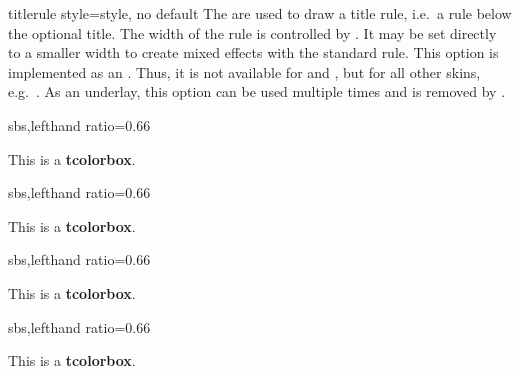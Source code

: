 \clearpage


\begin{docTcbKey}[][doc new=2015-01-14]{titlerule style}{=}{style, no default}
  The  are used to draw a title rule,
  i.e.\ a rule below the optional title. The width of the rule is controlled
  by . It may be set directly to a smaller width
  to create mixed effects with the standard rule.
  This option is implemented as an . Thus, it is not
  available for  and , but for
  all other skins, e.g.\ .
  As an underlay, this option can be used multiple times and is removed
  by .
\begin{dispExample*}{sbs,lefthand ratio=0.66}
\begin{tcolorbox}[enhanced,
  colback=red!5!white,colframe=red!75!black,
  colbacktitle=red!50!yellow,fonttitle=\bfseries,
  title=My title,
  titlerule=1mm,
  titlerule style=yellow  ]
This is a \textbf{tcolorbox}.
\end{tcolorbox}
\end{dispExample*}

\begin{dispExample*}{sbs,lefthand ratio=0.66}
\begin{tcolorbox}[enhanced,
  colback=red!5!white,colframe=red!75!black,
  colbacktitle=red!50!yellow,fonttitle=\bfseries,
  title=My title,
  titlerule=1mm,
  titlerule style={yellow,line width=0.5mm}  ]
This is a \textbf{tcolorbox}.
\end{tcolorbox}
\end{dispExample*}

\begin{dispExample*}{sbs,lefthand ratio=0.66}
\begin{tcolorbox}[enhanced,
  colback=red!10!white,colframe=red!75!black,
  colbacktitle=red!50!yellow,fonttitle=\bfseries,
  frame hidden,
  title=My title,
  boxrule=0pt,titlerule=1mm,
  titlerule style=red!50!black  ]
This is a \textbf{tcolorbox}.
\end{tcolorbox}
\end{dispExample*}

\begin{dispExample*}{sbs,lefthand ratio=0.66}
\begin{tcolorbox}[empty,
  coltitle=red!75!black,fonttitle=\bfseries,
  borderline horizontal={0.5mm}{0pt}{red!50!white},
  title=My title,
  titlerule style={red,
    arrows = {Hooks[arc=270]-Hooks[arc=270]}} ]
This is a \textbf{tcolorbox}.
\end{tcolorbox}
\end{dispExample*}
\end{docTcbKey}

